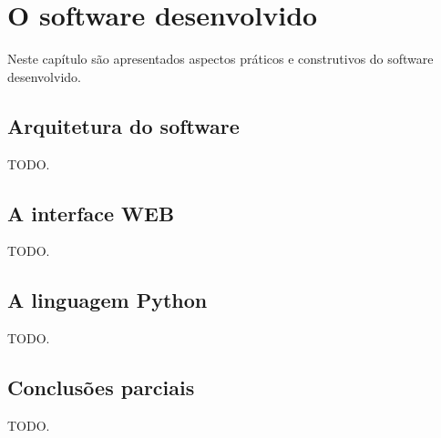 \chapter{O software desenvolvido \label{cap:software}}

Neste capítulo são apresentados aspectos práticos e construtivos do
software desenvolvido.

\section{Arquitetura do software}

    TODO.

\section{A interface WEB}

    TODO.

\section{A linguagem Python}

    TODO.

\section{Conclusões parciais}

    TODO.
